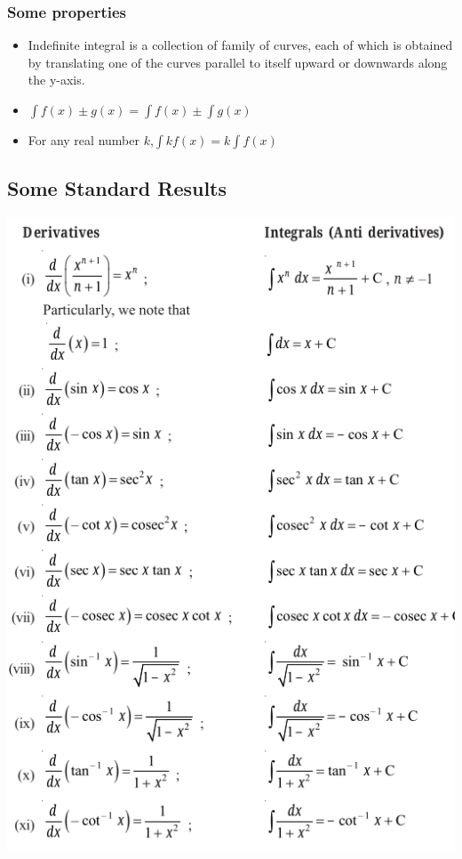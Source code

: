 \documentclass[12pt]{article}
\begin{document}
\subsubsection*{Some properties}
    \begin{itemize}
        \item Indefinite integral is a collection of family of curves, each of which is obtained by translating one of the curves parallel to itself upward or downwards along the y-axis.
        \item $\int f(x) \pm g(x)=\int f(x) \pm \int g(x)$
        \item For any real number $k$,$\int k f(x) =k \int f(x)$
    \end{itemize}

    \subsection*{Some Standard Results}
    \includegraphics*[scale=0.67]{1.png}
\end{document}
